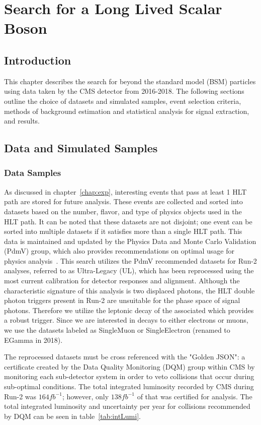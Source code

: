 
\chapter{Search for a Long Lived Scalar Boson}
\section{Introduction} \label{sec:ana_intro}
This chapter describes the search for beyond the standard model (BSM) particles using data taken by the CMS detector from 2016-2018. The following sections outline the choice of datasets and simulated samples, event selection criteria, methods of background estimation and statistical analysis for signal extraction, and results.

\section{Data and Simulated Samples} \label{sec:ana_samples}

\subsection{Data Samples} \label{sec:ana_data}
As discussed in chapter~\ref{chap:exp}, interesting events that pass at least 1 HLT path are stored for future analysis. These events are collected and sorted into datasets based on the number, flavor, and type of physics objects used in the HLT path. It can be noted that these datasets are not disjoint; one event can be sorted into multiple datasets if it satisfies more than a single HLT path. This data is maintained and updated by the Physics Data and Monte Carlo Validation (PdmV) group, which also provides recommendations on optimal usage for physics analysis~\cite{pdmv}. This search utilizes the PdmV recommended datasets for Run-2 analyses, referred to as Ultra-Legacy (UL), which has been reprocessed using the most current calibration for detector responses and alignment. Although the characteristic signature of this analysis is two displaced photons, the HLT double photon triggers present in Run-2 are unsuitable for the phase space of signal photons. Therefore we utilize the leptonic decay of the associated \VZ which provides a robust trigger. Since we are interested in \VZ decays to either electrons or muons, we use the datasets labeled as SingleMuon or SingleElectron (renamed to EGamma in 2018).

The reprocessed datasets must be cross referenced with the "Golden JSON": a certificate created by the Data Quality Monitoring (DQM) group within CMS by monitoring each sub-detector system in order to veto collisions that occur during sub-optimal conditions. The total integrated luminosity recorded by CMS during Run-2 was $164\unit{fb^{-1}}$; however, only $138\unit{fb^{-1}}$ of that was certified for analysis. The total integrated luminosity and uncertainty per year for collisions recommended by DQM can be seen in table~\ref{tab:intLumi}.

